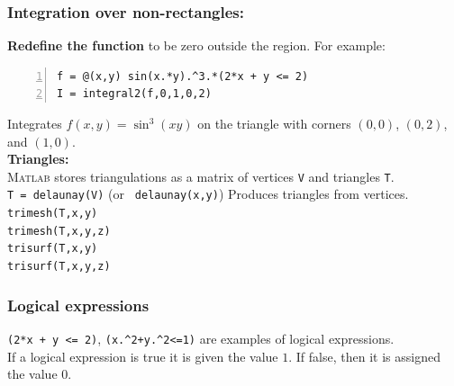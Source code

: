 \subsubsection*{Integration over non-rectangles:}
{\bf Redefine the function} to be zero outside the region. 
For example:
\begin{lstlisting}[frame=none,numbers=left]
f = @(x,y) sin(x.*y).^3.*(2*x + y <= 2)
I = integral2(f,0,1,0,2)
\end{lstlisting}
Integrates $f(x,y) = \sin^3(xy)$ on the triangle with corners $(0,0)$, $(0,2)$, and
$(1,0)$.\\
%


{\bf Triangles:}\\
\textsc{Matlab} stores triangulations as a matrix of vertices
\verb&V& and triangles \verb&T&.
\\
\verb&T = delaunay(V)&  (or \verb& delaunay(x,y)&) \dotfill Produces triangles from vertices.\\
\verb&trimesh(T,x,y) &\\
\verb&trimesh(T,x,y,z) &\\
\verb&trisurf(T,x,y) &\\
\verb&trisurf(T,x,y,z) &


\subsubsection*{Logical expressions}
\verb&(2*x + y <= 2)&, \verb&(x.^2+y.^2<=1)& are examples of logical expressions.\\
If a logical expression is true it is given the value $1$. If false, then it is assigned the value $0$.



